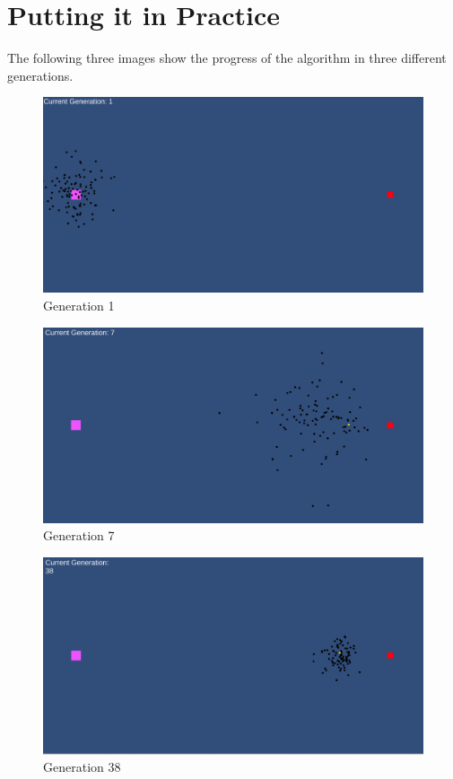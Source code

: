 \documentclass[twoside]{article}
\begin{document}
    \section{Putting it in Practice}\label{sec:putting-it-in-practice}
    The following three images show the progress of the algorithm in three different generations.
    \begin{figure}[hbtp]
        \centering
        \includegraphics[scale=0.2]{Basic Training - Generation 1}
        \caption {Generation 1}
        \label{fig:Gen1Basic}
    \end{figure}

    \begin{figure}[hbtp]
        \centering
        \includegraphics[scale=0.2]{Basic Training - Generation 7}
        \caption {Generation 7}
        \label{fig:Gen7Basic}
    \end{figure}

    \begin{figure}[hbtp]
        \centering
        \includegraphics[scale=0.2]{Basic Training - Generation 38}
        \caption {Generation 38}
        \label{fig:Gen38Basic}
    \end{figure}
\end{document}
